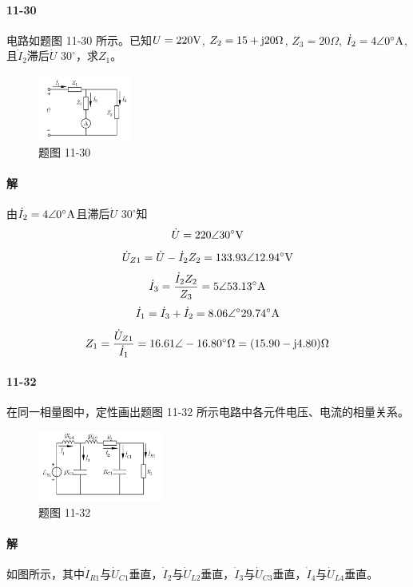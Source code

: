\documentclass[hyperref, UTF8]{ctexart}
\newcommand{\volt}{{\rm V}}
\newcommand{\ampere}{{\rm A}}
\newcommand{\ohm}{\Omega}
\newcommand{\degree}{^{\circ}}
\newcommand{\J}{{\rm j}}
\begin{document}
\paragraph{11-30}\label{11-30}
电路如题图 11-30 所示。已知$U=220\volt$, $Z_2=15+\J 20\ohm$, $Z_3=20\ohm$, $\dot{I}_2=4\angle 0\degree \ampere$, 且$\dot{I}_2$滞后$\dot{U}$ $30\degree$，求$Z_1$。

\begin{figure}[!htb]
\centering
\includegraphics[width=0.275\textwidth]{p11-30.png}
\caption*{题图 11-30}
\end{figure}

\paragraph{解}由$\dot I_2 = 4 \angle 0 \degree \ampere$且滞后$\dot U$ $30 \degree$知
 $$ \dot U = 220 \angle 30 \degree \volt $$
 $$ \dot U _{Z1} = \dot U - \dot I _2 Z_2 = 133.93 \angle 12.94 \degree \volt $$
 $$ \dot I _3 = \frac{ \dot I _2 Z_2}{Z_3} = 5 \angle 53.13 \degree \ampere $$
 $$ \dot I _1 = \dot I _3 + \dot I _2 = 8.06 \angle \degree 29.74 \degree \ampere $$
 $$ Z_1 = \frac{ \dot U _{Z1}}{ \dot I _1} = 16.61 \angle -16.80 \degree \ohm = (15.90 - \J 4.80) \ohm $$

\paragraph{11-32}\label{11-32}
在同一相量图中，定性画出题图 11-32 所示电路中各元件电压、电流的相量关系。

\begin{figure}[!htb]
\centering
\includegraphics[width=0.367\textwidth]{p11-32.png}
\caption*{题图 11-32}
\end{figure}

\paragraph{解}
如图所示，其中$\dot I_{R1}$与$\dot U_{C1}$垂直，$\dot I_{2}$与$\dot U_{L2}$垂直，$\dot I_{3}$与$\dot U_{C3}$垂直，$\dot I_{4}$与$\dot U_{L4}$垂直。
\end{document}
